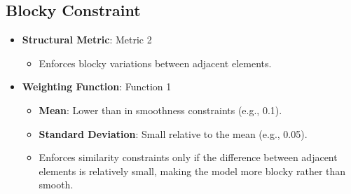 \documentclass[a4paper,12pt]{article}
\begin{document}
\subsection{Blocky Constraint}
\begin{itemize}
    \item \textbf{Structural Metric}: Metric 2
    \begin{itemize}
        \item Enforces blocky variations between adjacent elements.
    \end{itemize}
    \item \textbf{Weighting Function}: Function 1
    \begin{itemize}
        \item \textbf{Mean}: Lower than in smoothness constraints (e.g., 0.1).
        \item \textbf{Standard Deviation}: Small relative to the mean (e.g., 0.05).
        \item Enforces similarity constraints only if the difference between adjacent elements is relatively small, making the model more blocky rather than smooth.
    \end{itemize}
\end{itemize}
\end{document}
